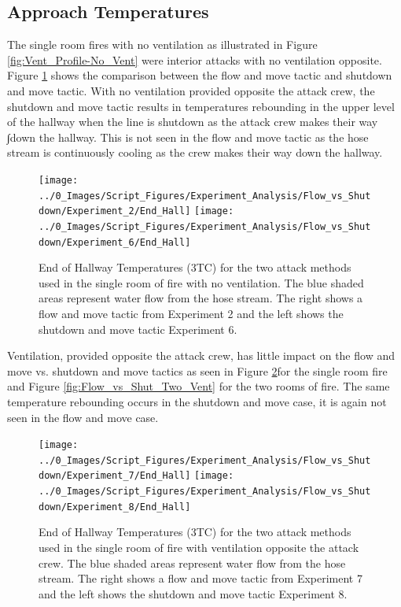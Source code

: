 \documentclass[12pt,oneside]{book}
\begin{document}
\subsection{Approach Temperatures}

The single room fires with no ventilation as illustrated in Figure \ref{fig:Vent_Profile-No_Vent} were interior attacks with no ventilation opposite. Figure \ref{fig:Flow_vs_Shut_Single_No_Vent} shows the comparison between the flow and move tactic and shutdown and move tactic. With no ventilation provided opposite the attack crew, the shutdown and move tactic results in temperatures rebounding in the upper level of the hallway when the line is shutdown as the attack crew makes their way ∫down the hallway. This is not seen in the flow and move tactic as the hose stream is continuously cooling as the crew makes their way down the hallway. 

\begin{figure}[H]
\centering
\texttt{[image: ../0\_Images/Script\_Figures/Experiment\_Analysis/Flow\_vs\_Shutdown/Experiment\_2/End\_Hall]}
\texttt{[image: ../0\_Images/Script\_Figures/Experiment\_Analysis/Flow\_vs\_Shutdown/Experiment\_6/End\_Hall]}
\caption[Single Room - No Vent - Flow \& Move vs. Shutdown \& Move - Hall Temperature]{End of Hallway Temperatures (3TC) for the two attack methods used in the single room of fire with no ventilation. The blue shaded areas represent water flow from the hose stream. The right shows a flow and move tactic from Experiment 2 and the left shows the shutdown and move tactic Experiment 6.}
\label{fig:Flow_vs_Shut_Single_No_Vent}
\end{figure}

Ventilation, provided opposite the attack crew, has little impact on the flow and move vs. shutdown and move tactics as seen in Figure \ref{fig:Flow_vs_Shut_Single_Vent}for the single room fire and Figure \ref{fig:Flow_vs_Shut_Two_Vent} for the two rooms of fire. The same temperature rebounding occurs in the shutdown and move case, it is again not seen in the flow and move case. 

\begin{figure}[H]
\centering
\texttt{[image: ../0\_Images/Script\_Figures/Experiment\_Analysis/Flow\_vs\_Shutdown/Experiment\_7/End\_Hall]}
\texttt{[image: ../0\_Images/Script\_Figures/Experiment\_Analysis/Flow\_vs\_Shutdown/Experiment\_8/End\_Hall]}
\caption[Single Room - Window Vent Opposite - Flow \& Move vs. Shutdown \& Move - Temperature]{End of Hallway Temperatures (3TC) for the two attack methods used in the single room of fire with ventilation opposite the attack crew. The blue shaded areas represent water flow from the hose stream. The right shows a flow and move tactic from Experiment 7 and the left shows the shutdown and move tactic Experiment 8.}
\label{fig:Flow_vs_Shut_Single_Vent}
\end{figure} 
\end{document}

